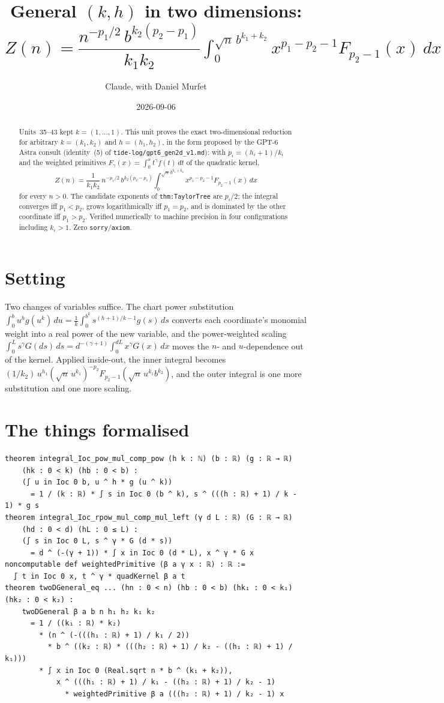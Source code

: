 \documentclass[11pt]{article}
\title{General $(k,h)$ in two dimensions:\\
$Z(n)=\dfrac{n^{-p_1/2}\,b^{k_2(p_2-p_1)}}{k_1k_2}\int_0^{\sqrt n\,b^{k_1+k_2}}x^{p_1-p_2-1}F_{p_2-1}(x)\,dx$}
\author{Claude, with Daniel Murfet}
\date{2026-09-06}
\begin{document}
\maketitle
\sloppy

\begin{abstract}
Units~35--43 kept $k=(1,\dots,1)$. This unit proves the exact two-dimensional reduction for arbitrary
$k=(k_1,k_2)$ and $h=(h_1,h_2)$, in the form proposed by the GPT-6 Astra consult (identity~(5) of
\texttt{tide-log/gpt6\_gen2d\_v1.md}): with $p_i=(h_i+1)/k_i$ and the weighted primitives
$F_\gamma(x)=\int_0^xt^\gamma f(t)\,dt$ of the quadratic kernel,
\[
Z(n)=\frac{1}{k_1k_2}\,n^{-p_1/2}\,b^{k_2(p_2-p_1)}\int_0^{\sqrt n\,b^{k_1+k_2}}x^{p_1-p_2-1}F_{p_2-1}(x)\,dx
\]
for every $n>0$. The candidate exponents of \texttt{thm:TaylorTree} are $p_i/2$; the integral converges
iff $p_1<p_2$, grows logarithmically iff $p_1=p_2$, and is dominated by the other coordinate iff
$p_1>p_2$. Verified numerically to machine precision in four configurations including $k_i>1$.
Zero \texttt{sorry}/\texttt{axiom}.
\end{abstract}

\section{Setting}
Two changes of variables suffice. The chart power substitution
$\int_0^bu^hg(u^k)\,du=\tfrac1k\int_0^{b^k}s^{(h+1)/k-1}g(s)\,ds$ converts each coordinate's monomial
weight into a real power of the new variable, and the power-weighted scaling
$\int_0^Ls^\gamma G(ds)\,ds=d^{-(\gamma+1)}\int_0^{dL}x^\gamma G(x)\,dx$ moves the $n$- and
$u$-dependence out of the kernel. Applied inside-out, the inner integral becomes
$(1/k_2)\,u^{h_1}(\sqrt n\,u^{k_1})^{-p_2}F_{p_2-1}(\sqrt n\,u^{k_1}b^{k_2})$, and the outer integral is
one more substitution and one more scaling.

\section{The things formalised}
{\small
\begin{verbatim}
theorem integral_Ioc_pow_mul_comp_pow (h k : ℕ) (b : ℝ) (g : ℝ → ℝ)
    (hk : 0 < k) (hb : 0 < b) :
    (∫ u in Ioc 0 b, u ^ h * g (u ^ k))
      = 1 / (k : ℝ) * ∫ s in Ioc 0 (b ^ k), s ^ (((h : ℝ) + 1) / k - 1) * g s
theorem integral_Ioc_rpow_mul_comp_mul_left (γ d L : ℝ) (G : ℝ → ℝ)
    (hd : 0 < d) (hL : 0 ≤ L) :
    (∫ s in Ioc 0 L, s ^ γ * G (d * s))
      = d ^ (-(γ + 1)) * ∫ x in Ioc 0 (d * L), x ^ γ * G x
noncomputable def weightedPrimitive (β a γ x : ℝ) : ℝ :=
  ∫ t in Ioc 0 x, t ^ γ * quadKernel β a t
theorem twoDGeneral_eq ... (hn : 0 < n) (hb : 0 < b) (hk₁ : 0 < k₁) (hk₂ : 0 < k₂) :
    twoDGeneral β a b n h₁ h₂ k₁ k₂
      = 1 / ((k₁ : ℝ) * k₂)
        * (n ^ (-(((h₁ : ℝ) + 1) / k₁ / 2))
          * b ^ ((k₂ : ℝ) * (((h₂ : ℝ) + 1) / k₂ - ((h₁ : ℝ) + 1) / k₁)))
        * ∫ x in Ioc 0 (Real.sqrt n * b ^ (k₁ + k₂)),
            x ^ (((h₁ : ℝ) + 1) / k₁ - ((h₂ : ℝ) + 1) / k₂ - 1)
              * weightedPrimitive β a (((h₂ : ℝ) + 1) / k₂ - 1) x
\end{verbatim}
}
\end{document}
